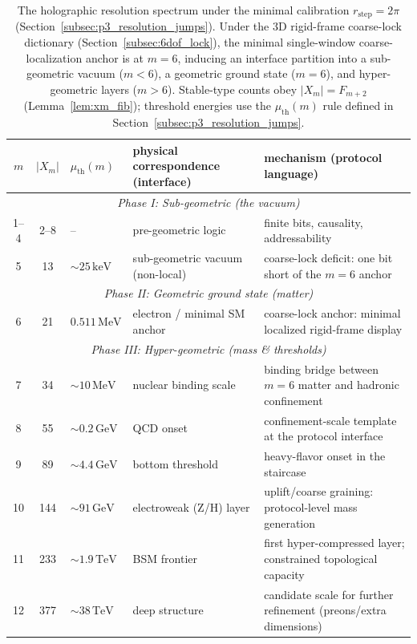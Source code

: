 \begin{table}[t]
\centering
\scriptsize
\setlength{\tabcolsep}{6pt}
\renewcommand{\arraystretch}{1.15}
\caption{The holographic resolution spectrum under the minimal calibration $r_{\mathrm{step}}=2\pi$ (Section~\ref{subsec:p3_resolution_jumps}). Under the $3$D rigid-frame coarse-lock dictionary (Section~\ref{subsec:6dof_lock}), the minimal single-window coarse-localization anchor is at $m=6$, inducing an interface partition into a sub-geometric vacuum ($m<6$), a geometric ground state ($m=6$), and hyper-geometric layers ($m>6$). Stable-type counts obey $|X_m|=F_{m+2}$ (Lemma~\ref{lem:xm_fib}); threshold energies use the $\mu_{\mathrm{th}}(m)$ rule defined in Section~\ref{subsec:p3_resolution_jumps}.}
\label{tab:resolution_spectrum}
\begin{tabular}{c c l >{\raggedright\arraybackslash}p{} >{\raggedright\arraybackslash}p{}}
\toprule
$m$ & $|X_m|$ & $\mu_{\mathrm{th}}(m)$ & physical correspondence (interface) & mechanism (protocol language) \\
\midrule
\multicolumn{5}{c}{\textit{Phase I: Sub-geometric (the vacuum)}} \\
1--4 & 2--8 & -- & pre-geometric logic & finite bits, causality, addressability \\
5 & 13 & $\sim 25\,\mathrm{keV}$ & sub-geometric vacuum (non-local) & coarse-lock deficit: one bit short of the $m=6$ anchor \\
\midrule
\multicolumn{5}{c}{\textit{Phase II: Geometric ground state (matter)}} \\
6 & 21 & $0.511\,\mathrm{MeV}$ & electron / minimal SM anchor & coarse-lock anchor: minimal localized rigid-frame display \\
\midrule
\multicolumn{5}{c}{\textit{Phase III: Hyper-geometric (mass \& thresholds)}} \\
7 & 34 & $\sim 10\,\mathrm{MeV}$ & nuclear binding scale & binding bridge between $m=6$ matter and hadronic confinement \\
8 & 55 & $\sim 0.2\,\mathrm{GeV}$ & QCD onset & confinement-scale template at the protocol interface \\
9 & 89 & $\sim 4.4\,\mathrm{GeV}$ & bottom threshold & heavy-flavor onset in the staircase \\
10 & 144 & $\sim 91\,\mathrm{GeV}$ & electroweak (Z/H) layer & uplift/coarse graining: protocol-level mass generation \\
11 & 233 & $\sim 1.9\,\mathrm{TeV}$ & BSM frontier & first hyper-compressed layer; constrained topological capacity \\
12 & 377 & $\sim 38\,\mathrm{TeV}$ & deep structure & candidate scale for further refinement (preons/extra dimensions) \\
\bottomrule
\end{tabular}
\end{table}
\FloatBarrier

